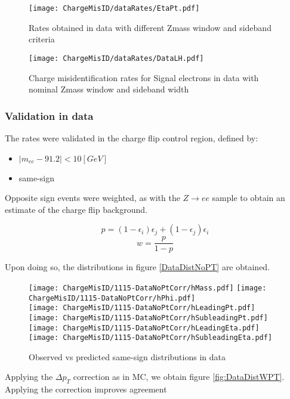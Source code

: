 \begin{figure}[h]
\ContinuedFloat
\centering
\texttt{[image: ChargeMisID/dataRates/EtaPt.pdf]}
\caption{Rates obtained in data with different Zmass window and sideband criteria}
\label{fig:DataRates}
\end{figure}

\begin{figure}[h]
\centering
\texttt{[image: ChargeMisID/dataRates/DataLH.pdf]}{}
\caption{Charge misidentification rates for Signal electrons in data with nominal Zmass window and sideband width}
\label{fig:DataRates2D}
\end{figure}

\FloatBarrier
\subsubsection*{Validation in data}
The rates were validated in the charge flip control region, defined by:

\begin{itemize}
\item $|m_{ee} - 91.2| < 10 [GeV]$
\item same-sign
\end{itemize}

Opposite sign events were weighted, as with the $Z\rightarrow ee$ sample to obtain an estimate of the charge flip background. 

$$p =(1-\epsilon_i)\epsilon_j + (1-\epsilon_j)\epsilon_i$$
$$w = \frac{p}{1-p}$$

Upon doing so, the distributions in figure \ref{DataDistNoPT} are obtained.

\begin{figure}[h]
\centering
\texttt{[image: ChargeMisID/1115-DataNoPtCorr/hMass.pdf]}
\texttt{[image: ChargeMisID/1115-DataNoPtCorr/hPhi.pdf]}\\
\texttt{[image: ChargeMisID/1115-DataNoPtCorr/hLeadingPt.pdf]}
\texttt{[image: ChargeMisID/1115-DataNoPtCorr/hSubleadingPt.pdf]}\\
\texttt{[image: ChargeMisID/1115-DataNoPtCorr/hLeadingEta.pdf]}
\texttt{[image: ChargeMisID/1115-DataNoPtCorr/hSubleadingEta.pdf]}
\caption{Observed vs predicted same-sign distributions in data}
\label{fig:DataDistNoPT}
\end{figure}

Applying the $\Delta p_T$ correction as in MC, we obtain figure \ref{fig:DataDistWPT}. Applying the \pT correction improves agreement

